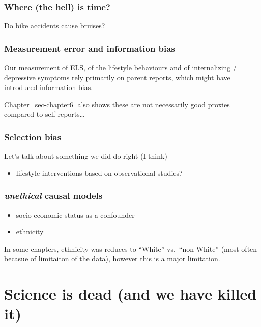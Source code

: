 \documentclass[
  letterpaper,
  DIV=11,
  numbers=noendperiod]{scrreport}
\providecommand{\tightlist}{%
  \setlength{\itemsep}{0pt}\setlength{\parskip}{0pt}}
\begin{document}
\subsubsection{\texorpdfstring{Where (the hell) is
\textbf{time}?}{Where (the hell) is time?}}\label{where-the-hell-is-time}

Do bike accidents cause bruises?

\subsubsection{Measurement error and information
bias}\label{measurement-error-and-information-bias}

Our measurement of ELS, of the lifestyle behaviours and of internalizing
/ depressive symptoms rely primarily on parent reports, which might have
introduced information bias.

Chapter~\ref{sec-chapter6} also shows these are not necessarily good
proxies compared to self reports\ldots{}

\subsubsection{Selection bias}\label{selection-bias}

Let's talk about something we did do right (I think)

\begin{itemize}
\tightlist
\item
  lifestyle interventions based on observational studies?
\end{itemize}

\subsubsection{\texorpdfstring{\emph{unethical} causal
models}{unethical causal models}}\label{unethical-causal-models}

\begin{itemize}
\tightlist
\item
  socio-economic status as a confounder
\item
  ethnicity
\end{itemize}

In some chapters, ethnicity was reduces to ``White'' vs.~``non-White''
(most often becasue of limitaiton of the data), however this is a major
limitation.

\section{Science is dead (and we have killed
it)}\label{science-is-dead-and-we-have-killed-it}
\end{document}
